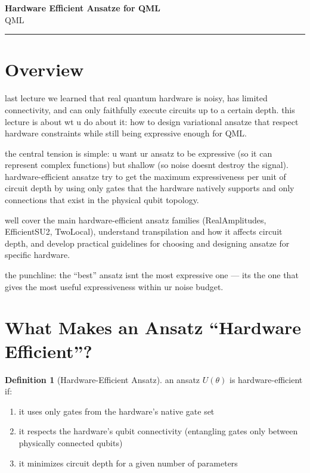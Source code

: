 \documentclass[11pt,a4paper]{article}
\theoremstyle{definition}
\newtheorem{definition}{Definition}[section]
\theoremstyle{remark}
\begin{document}
\begin{center}
    {\LARGE \textbf{Hardware Efficient Ansatze for QML}}\\[8pt]
    {\large QML}\\[12pt]
    \hrule
\end{center}

\vspace{12pt}
\tableofcontents
\newpage

\section{Overview}

last lecture we learned that real quantum hardware is noisy, has limited connectivity, and can only faithfully execute circuits up to a certain depth. this lecture is about wt u do about it: how to design variational ansatze that respect hardware constraints while still being expressive enough for QML.

the central tension is simple: u want ur ansatz to be expressive (so it can represent complex functions) but shallow (so noise doesnt destroy the signal). hardware-efficient ansatze try to get the maximum expressiveness per unit of circuit depth by using only gates that the hardware natively supports and only connections that exist in the physical qubit topology.

well cover the main hardware-efficient ansatz families (RealAmplitudes, EfficientSU2, TwoLocal), understand transpilation and how it affects circuit depth, and develop practical guidelines for choosing and designing ansatze for specific hardware.

the punchline: the ``best'' ansatz isnt the most expressive one --- its the one that gives the most useful expressiveness within ur noise budget.

\section{What Makes an Ansatz ``Hardware Efficient''?}

\begin{definition}[Hardware-Efficient Ansatz]
an ansatz $U(\theta)$ is hardware-efficient if:
\begin{enumerate}[label=(\arabic*)]
    \item it uses only gates from the hardware's native gate set
    \item it respects the hardware's qubit connectivity (entangling gates only between physically connected qubits)
    \item it minimizes circuit depth for a given number of parameters
\end{enumerate}
\end{definition}
\end{document}
